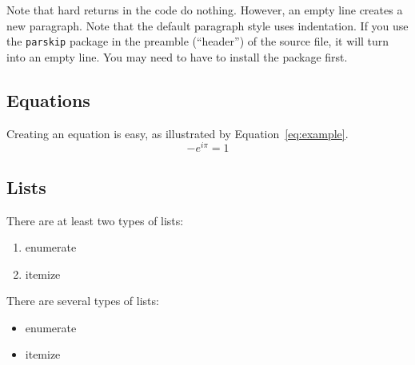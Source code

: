\documentclass[11pt]{article}
\begin{document}
Note that hard returns in the code do nothing.  However, an empty line creates a new paragraph.  Note that the
default paragraph style uses indentation.  If you use the \texttt{parskip} package in the preamble
(``header'') of the source file, it will turn into an empty line.  You may need to have to install the package
first.


\subsection{Equations}

Creating an equation is easy, as illustrated by Equation~\ref{eq:example}.
\begin{equation}
  -e^{i \pi} = 1
  \label{eq:example}
\end{equation}

\subsection{Lists}

There are at least two types of lists:
\begin{enumerate}
\item enumerate
\item itemize
\end{enumerate}

There are several types of lists:
\begin{itemize}
\item enumerate
\item itemize
\end{itemize}
\end{document}
